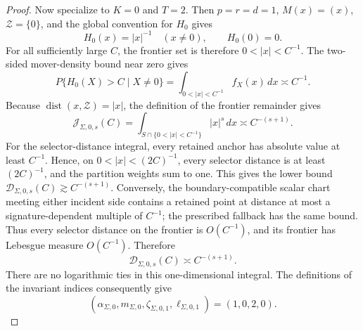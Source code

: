 \documentclass{article}
\begin{document}
\begin{proof}
Now specialize to \(K=0\) and \(T=2\).  Then \(p=r=d=1\), \(M(x)=(x)\), \(\mathcal Z=\{0\}\), and the global convention for \(H_0\) gives
\[
H_0(x)=|x|^{-1}\quad(x\ne0),
\qquad H_0(0)=0.
\]
For all sufficiently large \(C\), the frontier set is therefore \(0<|x|<C^{-1}\).  The two-sided mover-density bound near zero gives
\[
P\{H_0(X)>C\mid X\ne0\}
=\int_{0<|x|<C^{-1}}f_X(x)\,dx
\asymp C^{-1}.
\]
Because \(\operatorname{dist}(x,\mathcal Z)=|x|\), the definition of the frontier remainder gives
\[
\mathcal J_{\Sigma,0,s}(C)
=\int_{S\cap\{0<|x|<C^{-1}\}}|x|^s\,dx
\asymp C^{-(s+1)}.
\]
For the selector-distance integral, every retained anchor has absolute value at least \(C^{-1}\).  Hence, on \(0<|x|<(2C)^{-1}\), every selector distance is at least \((2C)^{-1}\), and the partition weights sum to one.  This gives the lower bound \(\mathcal D_{\Sigma,0,s}(C)\gtrsim C^{-(s+1)}\).  Conversely, the boundary-compatible scalar chart meeting either incident side contains a retained point at distance at most a signature-dependent multiple of \(C^{-1}\); the prescribed fallback has the same bound.  Thus every selector distance on the frontier is \(O(C^{-1})\), and its frontier has Lebesgue measure \(O(C^{-1})\).  Therefore
\[
\mathcal D_{\Sigma,0,s}(C)\asymp C^{-(s+1)}.
\]
There are no logarithmic ties in this one-dimensional integral.  The definitions of the invariant indices consequently give
\[
(\alpha_{\Sigma,0},m_{\Sigma,0},
\zeta_{\Sigma,0,1},\ell_{\Sigma,0,1})=(1,0,2,0).
\]


\end{proof}
\end{document}
